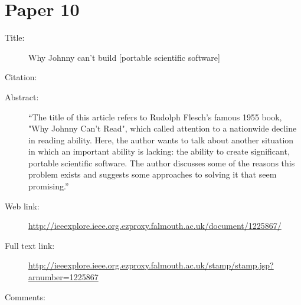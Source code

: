 \documentclass{scrartcl}
\begin{document}
\section*{Paper 10}
\begin{description}
\item[Title:] Why Johnny can't build [portable scientific software]
\item[Citation:] \cite{Dubois}
\item[Abstract:] ``The title of this article refers to Rudolph Flesch's famous 1955 book, "Why Johnny Can't Read", which called attention to a nationwide decline in reading ability. Here, the author wants to talk about another situation in which an important ability is lacking: the ability to create significant, portable scientific software. The author discusses some of the reasons this problem exists and suggests some approaches to solving it that seem promising.''
\item[Web link:] \url{http://ieeexplore.ieee.org.ezproxy.falmouth.ac.uk/document/1225867/}
\item[Full text link:]  \url{http://ieeexplore.ieee.org.ezproxy.falmouth.ac.uk/stamp/stamp.jsp?arnumber=1225867}
\item[Comments:]
\end{description}




\end{document}
